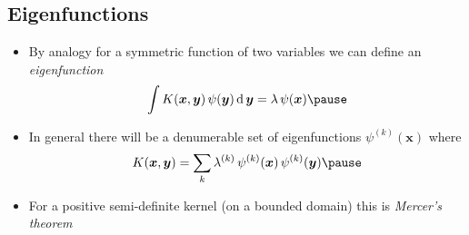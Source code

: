 \begin{slide}
\section{Eigenfunctions}

\begin{PauseHighLight}
  \begin{itemize}
  \item By analogy for a symmetric function of two variables we can
    define an \textit{eigenfunction}
    \begin{align*}
      \int K(\bm{x}, \bm{y})\, \psi(\bm{y}) \, \dd \, \bm{y} = \lambda
      \, \psi(\bm{x})\pause
    \end{align*}
  \item In general there will be a denumerable set of eigenfunctions
    $\psi^{(k)}(\bm{x})$ where
    \begin{align*}
      K(\bm{x}, \bm{y}) = \sum_k \lambda^{(k)}\,
      \psi^{(k)}(\bm{x})\,\psi^{(k)}(\bm{y})\pause
    \end{align*}
  \item For a positive semi-definite kernel (on a bounded domain) this
    is \emph{Mercer's theorem}\pause
  \end{itemize}
\end{PauseHighLight}

\end{slide}

